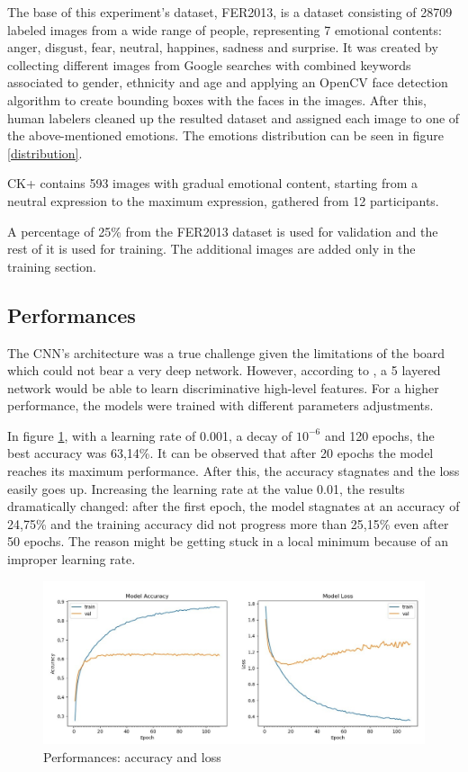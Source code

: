 \documentclass[runningheads,a4paper,12pt]{report}
\begin{document}
The base of this experiment's dataset, FER2013, is a dataset consisting of 28709 labeled images from a wide range of people, representing 7 emotional contents: anger, disgust, fear, neutral, happines, sadness and surprise. It was created by collecting different images from Google searches with combined keywords associated to gender, ethnicity and age and applying an OpenCV face detection algorithm to create bounding boxes with the faces in the images. After this, human labelers cleaned up the resulted dataset and assigned each image to one of the above-mentioned emotions. The emotions distribution can be seen in figure \ref{distribution}.

CK+ contains 593 images with gradual emotional content, starting from a neutral expression to the maximum expression, gathered from 12 participants. 

A percentage of 25\% from the FER2013 dataset is used for validation and the rest of it is used for training. The additional images are added only in the training section. 

\subsection{Performances}
\label{chapter:performances}
The CNN's architecture was a true challenge given the limitations of the board which could not bear a very deep network. However, according to \cite{fer-cnn}, a 5 layered network would be able to learn discriminative high-level features. For a higher performance, the models were trained with different parameters adjustments. 

In figure \ref{fig:result1}, with a learning rate of 0.001, a decay of $10^{-6}$ and 120 epochs, the best accuracy was 63,14\%. It can be observed that after 20 epochs the model reaches its maximum performance. After this, the accuracy stagnates and the loss easily goes up. Increasing the learning rate at the value 0.01, the results dramatically changed: after the first epoch, the model stagnates at an accuracy of 24,75\% and the training accuracy did not progress more than 25,15\% even after 50 epochs. The reason might be getting stuck in a local minimum because of an improper learning rate. 

\begin{figure}[h]
	\centering
	\includegraphics[width=\linewidth]{./images/3_results1}\hfill	
	\caption{Performances: accuracy and loss}  
    \label{fig:result1}
\end{figure}
\end{document}
